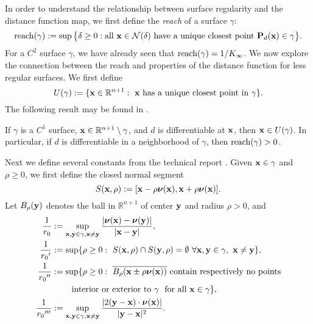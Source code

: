 
In order to understand the relationship between surface regularity and the distance function map, we first define the {\it reach} of a surface $\gamma$:  
%
\[
{\rm reach}(\gamma) := \sup \big\{\delta \ge 0:  \hbox{all } {\bf x}\in \mathcal{N}(\delta) \hbox{ have a unique closest point } {\bf P}_d({\bf x}) \in \gamma \big\}.
\]
%
For a $C^2$ surface $\gamma$, we have already seen that ${\rm reach}(\gamma)=1/K_\infty$.   We now explore the connection between the reach and properties of the distance function for less regular surfaces.  We first define
%
\[ U(\gamma):=\{{\bf x} \in \mathbb{R}^{n+1} :~{\bf x} \hbox{ has a unique closest point in } \gamma\}.
\]
%
The following result may be found in \cite[Theorem 4.8.3]{Fed59}.
\begin{lemma}  \label{lem:d_properties}
If $\gamma$ is a $C^1$ surface, ${\bf x} \in \mathbb{R}^{n+1} \setminus \gamma$, and $d$ is differentiable at ${\bf x}$, then ${\bf x} \in U(\gamma)$.  In particular, if $d$ is differentiable in a neighborhood of $\gamma$, then ${\rm reach}(\gamma)>0$.  
\end{lemma}

Next we define several constants from the technical report \cite{Luc57}.  Given ${\bf x} \in \gamma$ and $\rho\ge 0$, we first define the closed normal segment
%
\[
S({\bf x}, \rho):= [{\bf x}-\rho {\boldsymbol \nu}({\bf x}), {\bf x} + \rho {\boldsymbol \nu}({\bf x})].
\]
%
Let
$B_\rho({\bf y})$ denotes the ball in $\mathbb R^{n+1}$ of center ${\bf y}$ and radius $\rho>0$,
and
%
\begin{align*}
\begin{aligned}
\frac{1}{r_0} &:=\sup_{{\bf x},{\bf y} \in \gamma, {\bf x} \neq {\bf y}} \frac{|{\boldsymbol \nu}({\bf x})-{\boldsymbol \nu}({\bf y})|}{|{\bf x}-{\bf y}|},
\\ \frac{1}{r_0{'}}&:=\sup \{\rho \ge 0: ~S({\bf x}, \rho) \cap S({\bf y}, \rho)=\emptyset ~ \forall {\bf x}, {\bf y} \in \gamma, ~{\bf x} \neq {\bf y}\},
\\ \frac{1}{r_0{''}}&:=\sup \{ \rho \ge 0: ~ \overline{B_\rho ({\bf x} \pm \rho {\boldsymbol \nu}({\bf x}))} \hbox{ contain respectively no points}  \\ &~~~~~~\hbox{ interior or exterior to } \gamma ~
\hbox{ for all } {\bf x} \in \gamma\}, 
\\ \frac{1}{r_0{'''}}&:=\sup_{{\bf x},{\bf y} \in \gamma, {\bf x} \neq {\bf y}} \frac{|2({\bf y}-{\bf x}) \cdot {\boldsymbol \nu}({\bf x})|}{|{\bf y}-{\bf x}|^2}.
\end{aligned}
\end{align*}

